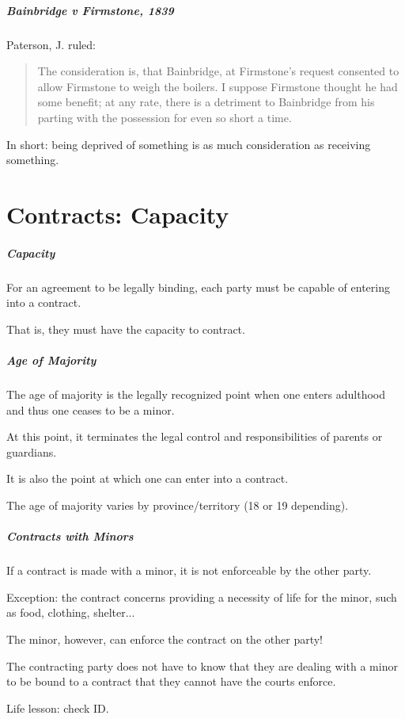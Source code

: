 \begin{frame}
\frametitle{\textit{Bainbridge v Firmstone}, 1839}

Paterson, J. ruled:
\begin{quote}
The consideration is, that Bainbridge, at Firmstone's request consented to allow Firmstone to weigh the boilers.  I suppose Firmstone thought he had some benefit; at any rate, there is a detriment to Bainbridge from his parting with the possession for even so short a time.
\end{quote}

In short: being deprived of something is as much consideration as receiving something.

\end{frame}

\part{Contracts: Capacity}

\begin{frame}
\partpage
\end{frame}



\begin{frame}
\frametitle{Capacity}

For an agreement to be legally binding, each party must be capable of entering into a contract.

That is, they must have the \alert{capacity to contract}.


\end{frame}



\begin{frame}
\frametitle{Age of Majority}

The age of majority is the legally recognized point when one enters adulthood and thus one ceases to be a minor.

At this point, it terminates the legal control and responsibilities of parents or guardians.

It is also the point at which one can enter into a contract.

The age of majority varies by province/territory (18 or 19 depending).

\end{frame}



\begin{frame}
\frametitle{Contracts with Minors}

If a contract is made with a minor, it is not enforceable by the other party.

Exception: the contract concerns providing a necessity of life for the minor, such as food, clothing, shelter...

The minor, however, can enforce the contract on the other party!

The contracting party does not have to know that they are dealing with a minor to be bound to a contract that they cannot have the courts enforce.

Life lesson: check ID.

\end{frame}



